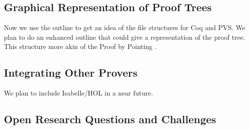 \documentclass{entcs}
\begin{document}
\subsection{Graphical Representation of Proof Trees}
Now we use the outline to get an idea of the file structures for Coq and PVS.
We plan to do an enhanced outline that could give a representation
of the proof tree. This structure more akin of the Proof by Pointing \cite{bertot94proof}.
\subsection{Integrating Other Provers}
We plan to include Isabelle/HOL in a near future.
\subsection{Open Research Questions and Challenges}




%


\end{document}
